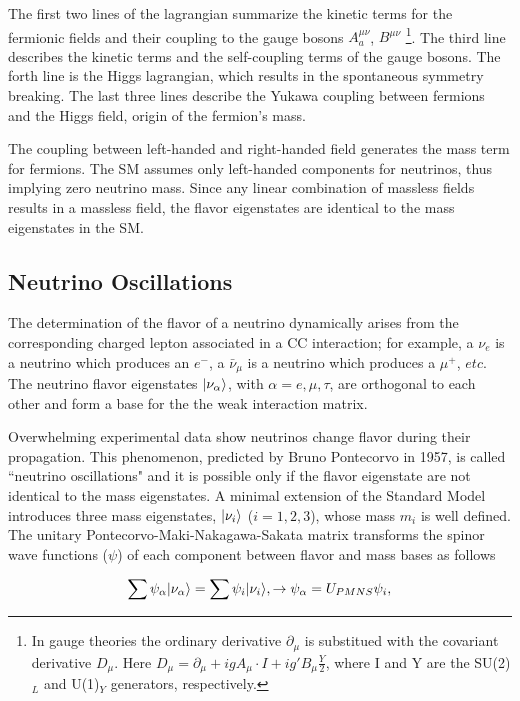 The first two lines of the lagrangian summarize the kinetic terms for the fermionic fields and their coupling to the gauge bosons $A^{\mu\nu}_a$, $B^{\mu\nu}$ \footnote{In gauge theories the ordinary derivative $\partial_\mu$  is substitued with the covariant derivative $D_\mu$. Here $D_\mu = \partial_\mu + igA_\mu \cdot I + ig'B_\mu\frac{Y}{2}$, where I and Y are the SU(2)$_L$ and U(1)$_Y$ generators, respectively.}.
The third line describes the kinetic terms and the self-coupling terms of the gauge bosons. The forth line is the Higgs lagrangian, which results in the spontaneous symmetry breaking. The last three lines describe the Yukawa coupling between fermions and the Higgs field, origin of the fermion's mass.

The coupling between left-handed and right-handed field generates the mass term for fermions. The SM assumes only left-handed components for neutrinos, thus implying zero neutrino mass. Since any linear combination of massless fields results in a massless field, the flavor eigenstates are identical to the mass eigenstates in the SM.

\subsection{Neutrino Oscillations}
The determination of the flavor of a neutrino dynamically arises from the corresponding charged lepton associated in a CC interaction; for example, a $\nu_e$ is a neutrino which produces an $e^-$, a $\bar\nu_\mu$ is a neutrino which produces a $\mu^+$, $etc$. 
The neutrino flavor eigenstates $\lvert\nu_\alpha\rangle$,  with $\alpha = e,\mu,\tau$, are orthogonal to each other and form a base for the the weak interaction matrix.

Overwhelming experimental data show neutrinos change flavor during their propagation. This phenomenon, predicted by Bruno Pontecorvo in 1957, is  called ``neutrino oscillations" and it is possible only if the flavor eigenstate are not identical to the mass eigenstates. A minimal extension of the Standard Model introduces three mass eigenstates, $\lvert\nu_i\rangle$ ($i = 1,2, 3$), whose mass $m_i$ is well defined. 
The unitary Pontecorvo-Maki-Nakagawa-Sakata matrix transforms the spinor wave functions ($\psi$) of each component  between flavor and mass bases as follows

\begin{equation} 
\sum \psi_\alpha \lvert\nu_\alpha\rangle =  \sum \psi_i \lvert\nu_i\rangle, \rightarrow \psi_\alpha =  U_{PMNS} \psi_i, 
\end{equation}

